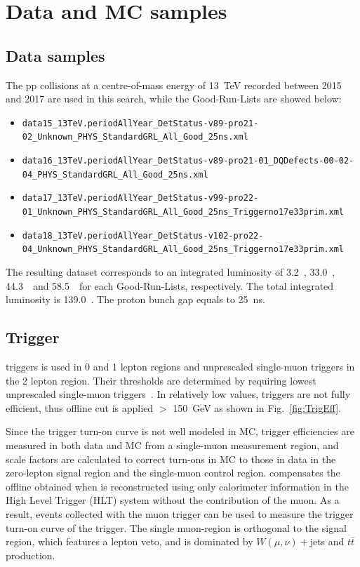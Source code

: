 \chapter{Data and MC samples}
\label{ch:ana-intro}

\section{Data samples}
The pp collisions at a centre-of-mass
energy of 13~TeV recorded between 2015 and 2017 are used in this search, while the Good-Run-Lists are showed below:
\begin{itemize}
        \scriptsize
\item \texttt{data15\_13TeV.periodAllYear\_DetStatus-v89-pro21-02\_Unknown\_PHYS\_StandardGRL\_All\_Good\_25ns.xml}
\item \texttt{data16\_13TeV.periodAllYear\_DetStatus-v89-pro21-01\_DQDefects-00-02-04\_PHYS\_StandardGRL\_All\_Good\_25ns.xml}
\item \texttt{data17\_13TeV.periodAllYear\_DetStatus-v99-pro22-01\_Unknown\_PHYS\_StandardGRL\_All\_Good\_25ns\_Triggerno17e33prim.xml}
\item \texttt{data18\_13TeV.periodAllYear\_DetStatus-v102-pro22-04\_Unknown\_PHYS\_StandardGRL\_All\_Good\_25ns\_Triggerno17e33prim.xml}
\end{itemize}
The resulting dataset corresponds to an integrated luminosity of 3.2~\ifb, 33.0~\ifb, 44.3~\ifb\ and 58.5~\ifb\ for each Good-Run-Lists, respectively. The total integrated luminosity is 139.0~\ifb. The proton bunch gap equals to 25~ns.


\section{Trigger}
\label{sec:trigger}

\met triggers is used in 0 and 1 lepton regions and unprescaled single-muon triggers in the 2 lepton region. 
Their thresholds are determined by requiring lowest unprescaled single-muon triggers~\cite{lowest_unprescaled_triggers}. 
In relatively low \met values, \met triggers are not fully efficient, thus offline \met cut is applied \met $>$ 150~GeV as shown in Fig.~\ref{fig:TrigEff}.

Since the trigger turn-on curve is not well modeled in MC, trigger efficiencies are measured in both data and MC from a single-muon measurement region, and scale factors are calculated to correct
turn-ons in MC to those in data in the zero-lepton signal region and the single-muon control region.
\metnomu compensates the offline \met obtained when \met is reconstructed using only calorimeter information in the High Level Trigger (HLT) system without the contribution of the muon.
As a result, events collected with the muon trigger can be used to measure the trigger turn-on curve of the \met trigger.
The single muon-region is orthogonal to the signal region, which features a lepton veto, and is dominated by $W(\mu,\nu)+$jets and $t\bar{t}$ production.

